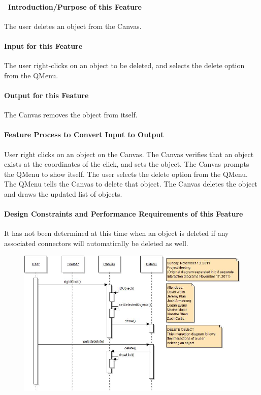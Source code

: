 \documentclass[twoside,letterpaper]{article}
\begin{document}
{\paragraph[\ Introduction/Purpose of this Feature]
{\ Introduction/Purpose of this Feature}
{\color{black}
The user deletes an object from the Canvas.
}

\paragraph[Input for this Feature]{Input for this Feature}
{\color{black}
The user right-clicks on an object to be deleted, and selects the delete option from the QMenu.
}

\paragraph{Output for this Feature}
{\color{black}
The Canvas removes the object from itself.
}

\paragraph{Feature Process to Convert Input to Output}
{\color{black}
User right clicks on an object on the Canvas. The Canvas verifies that an object exists at the coordinates of the click, and sets the object.  The Canvas prompts the QMenu to show itself.  The user selects the delete option from the QMenu.  The QMenu tells the Canvas to delete that object. The Canvas deletes the object and draws the updated list of objects.
}

\paragraph{Design Constraints and Performance Requirements of this Feature}
{\color{black}
It has not been determined at this time when an object is deleted if any associated connectors will automatically be deleted as well.
}
\bigskip
\bigskip

\begin{figure}[h]
\centering
\includegraphics[width=6.0in]{IntDelObj.jpg}
\end{figure}

}
\end{document}
